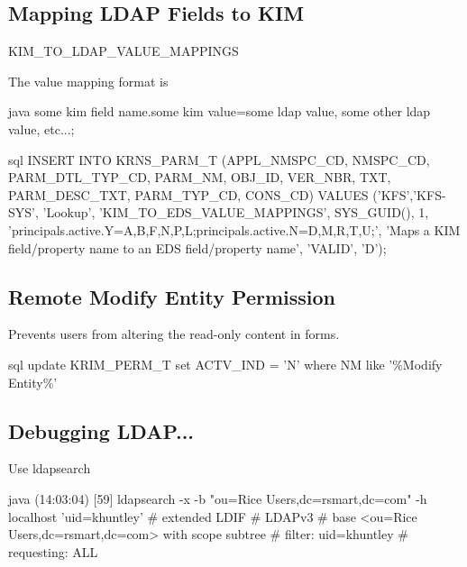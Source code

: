 \documentclass[12pt,notitlepage]{article}
\begin{document}
\begin{s5presentation}
%
%
  \W \begin{s5slide}
    \section{Mapping LDAP Fields to KIM}
    KIM_TO_LDAP_VALUE_MAPPINGS

    The value mapping format is 
    \begin{code}{java}
some kim field name.some kim value=some ldap value, some other ldap value, etc...;
    \end{code}

    \begin{code}{sql}
INSERT INTO KRNS_PARM_T 
(APPL_NMSPC_CD, NMSPC_CD, PARM_DTL_TYP_CD, PARM_NM, OBJ_ID, VER_NBR, TXT, PARM_DESC_TXT, PARM_TYP_CD, CONS_CD)
VALUES ('KFS','KFS-SYS', 'Lookup', 'KIM_TO_EDS_VALUE_MAPPINGS', SYS_GUID(), 1, 'principals.active.Y=A,B,F,N,P,L;principals.active.N=D,M,R,T,U;', 'Maps a KIM field/property name to an EDS field/property name', 'VALID', 'D');
      \end{code}

    \W \end{s5slide}

%
%
  \W \begin{s5slide}
    \section{Remote Modify Entity Permission}
    Prevents users from altering the read-only content in forms.
    
    \begin{code}{sql}
update KRIM_PERM_T set ACTV_IND = 'N' where NM like '\%Modify Entity\%'
      \end{code}

    \W \end{s5slide}
%
%
  \W \begin{s5slide}
    \section{Debugging LDAP...}
    Use ldapsearch

    \begin{code}{java}
(14:03:04) [59] ldapsearch -x -b "ou=Rice Users,dc=rsmart,dc=com" -h localhost  'uid=khuntley'
# extended LDIF
# LDAPv3
# base <ou=Rice Users,dc=rsmart,dc=com> with scope subtree
# filter: uid=khuntley
# requesting: ALL


\end{code}
\end{s5slide}
\end{s5presentation}
\end{document}
